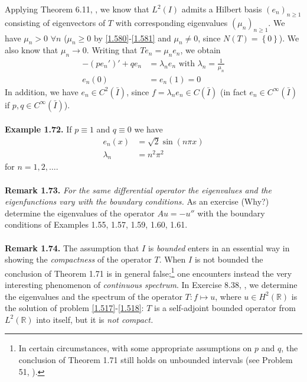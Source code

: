 \documentclass[a4paper,oneside]{article}
\numberwithin{equation}{section}
\begin{document}
Applying Theorem 6.11, \cite{1}, we know that $L^2\left(I\right)$ admits a Hilbert basis $\left(e_n\right)_{n\ge 1}$ consisting of eigenvectors of $T$ with corresponding eigenvalues $\left(\mu _n\right)_{n\ge 1}$. We have $\mu _n>0$ $\forall n$ ($\mu _n\ge 0$ by \eqref{1.580}-\eqref{1.581} and $\mu _n\ne 0$, since $N\left( T \right) = \left\{ 0 \right\}$). We also know that $\mu _n\to 0$. Writing that $Te_n=\mu _ne_n$, we obtain
\begin{align}
 - \left( {p{e_n}'} \right)' + q{e_n} &= {\lambda _n}{e_n}\mbox{ with } {\lambda _n} = \frac{1}{{{\mu _n}}}\\
{e_n}\left( 0 \right) &= {e_n}\left( 1 \right) = 0
\end{align}
In addition, we have $e_n\in C^2\left(\bar I\right)$, since $f=\lambda _ne_n\in C\left(\bar I\right)$ (in fact $e_n\in C^{\infty}\left(\bar I\right)$ if $p,q\in C^{\infty}\left(\bar I\right)$).\\
\\
\textbf{Example 1.72.} If $p \equiv 1$ and $q \equiv 0$ we have
\begin{align}
{e_n}\left( x \right) &= \sqrt 2 \sin \left( {n\pi x} \right)\\
{\lambda _n}& = {n^2}{\pi ^2}
\end{align}
for $n=1,2,\ldots$.\\
\\
\textbf{Remark 1.73.} \textit{For the same differential operator the eigenvalues and the eigenfunctions vary with the boundary conditions.} As an exercise  (Why?) determine the eigenvalues of the operator $Au=-u''$ with the boundary conditions of Examples 1.55, 1.57, 1.59, 1.60, 1.61.\\
\\
\textbf{Remark 1.74.} The assumption that $I$ is \textit{bounded} enters in an essential way in showing the \textit{compactness} of the operator $T$. When $I$ is not bounded the conclusion of Theorem 1.71 is in general false;\footnote{In certain circumstances, with some appropriate assumptions on $p$ and $q$, the conclusion of Theorem 1.71 still holds on unbounded intervals (see Problem 51, \cite{1}).} one encounters instead the very interesting phenomenon of \textit{continuous spectrum}. In Exercise 8.38, \cite{1}, we determine the eigenvalues and the spectrum of the operator $T:f\mapsto u$, where $u\in H^2\left(\mathbb{R}\right)$ is the solution of problem \eqref{1.517}-\eqref{1.518}: $T$ is a self-adjoint bounded operator from $L^2\left(\mathbb{R}\right)$ into itself, but it is \textit{not compact.}
\end{document}

